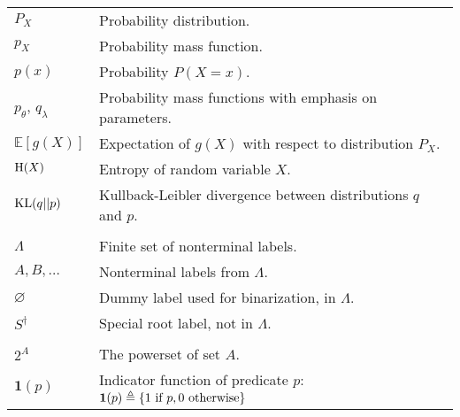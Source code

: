 \begin{table}[h]
\begin{tabular}{ll}
    $P_X$ & Probability distribution.  \\
    $p_{X}$ & Probability mass function. \\
    $p(x)$ & Probability $P(X = x)$. \\
    $p_{\theta}$, $q_{\lambda}$ & Probability mass functions with emphasis on parameters.   \\
    $\mathbb{E}[g(X)]$ & Expectation of $g(X)$ with respect to distribution $P_X$.  \\
    $\operatorname{H}(X)$ & Entropy of random variable $X$. \\
    $\operatorname{KL}(q \rvert\lvert p)$ & Kullback-Leibler divergence between distributions $q$ and $p$. \\
    & \\

    $\Lambda$ & Finite set of nonterminal labels.  \\
    $A, B, \dots$ & Nonterminal labels from $\Lambda$.  \\
    $\varnothing$ & Dummy label used for binarization, in $\Lambda$.  \\
    $S^{\dagger}$ & Special root label, not in $\Lambda$.  \\
    & \\

    $2^A$ & The powerset of set $A$.  \\
    $\mathbf{1}(p)$  & Indicator function of predicate $p$: $\mathbf{1}(p) \triangleq \{ 1 \text{ if } p, 0 \text{ otherwise}\}$ \\

  \end{tabular}

\end{table}

% 

